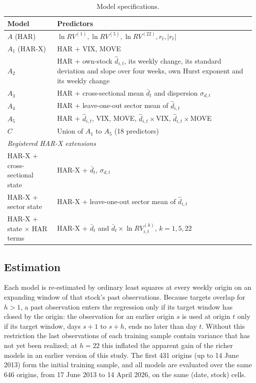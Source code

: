 \begin{table}[H]
\caption{Model specifications.}
\label{tab:models}
\footnotesize
\begin{tabularx}{\textwidth}{lX}
\toprule
Model & Predictors \\
\midrule
$A$ (HAR) & $\ln RV^{(1)}, \ln RV^{(5)}, \ln RV^{(22)}, r_t, \lvert r_t\rvert$ \\
$A_1$ (HAR-X) & HAR + VIX, MOVE \\
$A_2$ & HAR + own-stock $\hat d_{i,t}$, its weekly change, its standard deviation and slope over four weeks, own Hurst exponent and its weekly change \\
$A_3$ & HAR + cross-sectional mean $\bar d_t$ and dispersion $\sigma_{d,t}$ \\
$A_4$ & HAR + leave-one-out sector mean of $\hat d_{i,t}$ \\
$A_5$ & HAR + $\hat d_{i,t}$, VIX, MOVE, $\hat d_{i,t}\times$VIX, $\hat d_{i,t}\times$MOVE \\
$C$ & Union of $A_1$ to $A_5$ (18 predictors) \\
\midrule
\multicolumn{2}{l}{\textit{Registered HAR-X extensions}} \\
HAR-X + cross-sectional state & HAR-X + $\bar d_t$, $\sigma_{d,t}$ \\
HAR-X + sector state & HAR-X + leave-one-out sector mean of $\hat d_{i,t}$ \\
HAR-X + state $\times$ HAR terms & HAR-X + $\bar d_t$ and $\bar d_t\times \ln RV^{(k)}_{i,t}$, $k=1,5,22$ \\
\bottomrule
\end{tabularx}
\end{table}

\subsection{Estimation}

Each model is re-estimated by ordinary least squares at every weekly origin
on an expanding window of that stock's past observations. Because targets
overlap for $h>1$, a past observation enters the regression only if its
target window has closed by the origin: the observation for an earlier
origin $s$ is used at origin $t$ only if its target window, days $s+1$ to
$s+h$, ends no later than day $t$. Without this restriction the last
observations of each training sample contain variance that has not yet been
realized; at $h=22$ this inflated the apparent gain of the richer models in
an earlier version of this study. The first 431 origins (up to 14 June 2013)
form the initial training sample, and all models are evaluated over the same
646 origins, from 17 June 2013 to 14 April 2026, on the same (date, stock)
cells.

